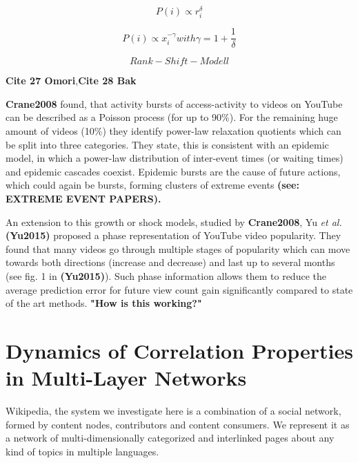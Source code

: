\documentclass[a4paper,10pt]{scrbook}
\begin{document}
\begin{equation}
P(i) \propto r_i^{\delta}
\end{equation}

\begin{equation}
P(i) \propto x_i^{-\gamma}   with   \gamma = 1 + \frac{1}{\delta}
\end{equation}

\begin{equation}
Rank-Shift-Modell
\end{equation}

\textbf{Cite 27 Omori},\textbf{Cite 28 Bak}


\textbf{Crane2008} found, that activity bursts of access-activity to videos on YouTube can be described as a Poisson process (for up to 90$\%$). For the remaining huge amount of videos (10$\%$) they identify power-law relaxation quotients which can be split into three categories. They state, this is consistent with an epidemic model, in which a power-law distribution of inter-event times (or waiting times) and epidemic cascades coexist. Epidemic bursts are the cause of future actions, which could again be bursts, forming clusters of extreme events \textbf{(see: EXTREME EVENT PAPERS).}

An extension to this growth or shock models, studied by \textbf{Crane2008}, Yu \textit{et al.} \cite{Yu2015} \textbf{(Yu2015)} proposed a phase representation of YouTube video popularity. They found that many videos go through multiple stages of popularity which can move towards both directions (increase and decrease) and last up to several months (see fig. 1 in \textbf{(Yu2015)}). Such phase information allows them to reduce the average prediction error for future view count gain significantly compared to state of the art methods. \textbf{"How is this working?"}





\section{Dynamics of Correlation Properties in Multi-Layer Networks}


Wikipedia, the system we investigate here is a combination of a social network, formed by content nodes, contributors and content consumers. We represent it as a network of multi-dimensionally categorized and interlinked pages about any kind of topics in multiple languages.
\end{document}
